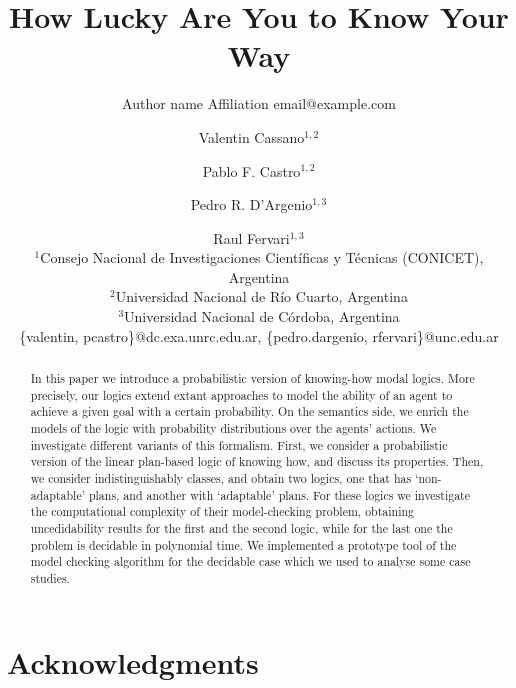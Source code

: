 \documentclass{article}
\title{How Lucky Are You to Know Your Way}
\author{%
    Author name
    \affiliations
    Affiliation
    \emails
    email@example.com    %
}
\author{%
Valentin Cassano$^{1,2}$\and
Pablo F. Castro$^{1,2}$\and
Pedro R. D'Argenio$^{1,3}$\and
Raul Fervari$^{1,3}$ \\
\affiliations
$^1$Consejo Nacional de Investigaciones Cient\'ificas y T\'ecnicas (CONICET), Argentina\\
$^2$Universidad Nacional de R\'io Cuarto, Argentina\\
$^3$Universidad Nacional de C\'ordoba, Argentina\\
\emails
\{valentin, pcastro\}@dc.exa.unrc.edu.ar,
\{pedro.dargenio, rfervari\}@unc.edu.ar
}
\begin{document}
\maketitle

\begin{abstract}
  In this paper we introduce a probabilistic version of knowing-how modal logics.  More precisely,  our logics extend extant approaches to model the ability of an agent to achieve a given goal with a certain probability.  On the semantics side,  we enrich the models of the logic with probability distributions over the agents' actions.  We investigate different variants of this formalism.  First,  we consider a probabilistic version of the linear plan-based logic of knowing how, and discuss its properties. Then, we consider indistinguishably classes,  and obtain two logics,  one that has `non-adaptable' plans, and another  with `adaptable' plans. For these logics we investigate the computational complexity of their model-checking problem, obtaining uncedidability results for the first and the second logic, while for the last one the problem is decidable in polynomial time.  We implemented a prototype tool of the model checking algorithm for the decidable case which we used to analyse some case studies.
\end{abstract}






\section*{Acknowledgments}



\appendix






\end{document}
